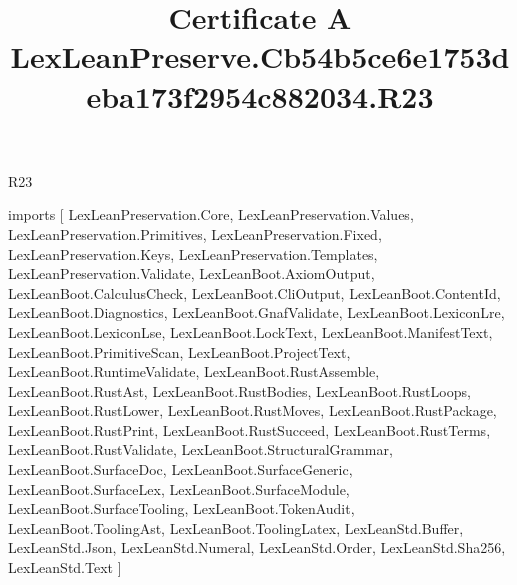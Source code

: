 \begin{lexlean}{R23}
\title{Certificate A LexLeanPreserve.Cb54b5ce6e1753deba173f2954c882034.R23}
\begin{coremodule}
imports [
  LexLeanPreservation.Core,
  LexLeanPreservation.Values,
  LexLeanPreservation.Primitives,
  LexLeanPreservation.Fixed,
  LexLeanPreservation.Keys,
  LexLeanPreservation.Templates,
  LexLeanPreservation.Validate,
  LexLeanBoot.AxiomOutput,
  LexLeanBoot.CalculusCheck,
  LexLeanBoot.CliOutput,
  LexLeanBoot.ContentId,
  LexLeanBoot.Diagnostics,
  LexLeanBoot.GnafValidate,
  LexLeanBoot.LexiconLre,
  LexLeanBoot.LexiconLse,
  LexLeanBoot.LockText,
  LexLeanBoot.ManifestText,
  LexLeanBoot.PrimitiveScan,
  LexLeanBoot.ProjectText,
  LexLeanBoot.RuntimeValidate,
  LexLeanBoot.RustAssemble,
  LexLeanBoot.RustAst,
  LexLeanBoot.RustBodies,
  LexLeanBoot.RustLoops,
  LexLeanBoot.RustLower,
  LexLeanBoot.RustMoves,
  LexLeanBoot.RustPackage,
  LexLeanBoot.RustPrint,
  LexLeanBoot.RustSucceed,
  LexLeanBoot.RustTerms,
  LexLeanBoot.RustValidate,
  LexLeanBoot.StructuralGrammar,
  LexLeanBoot.SurfaceDoc,
  LexLeanBoot.SurfaceGeneric,
  LexLeanBoot.SurfaceLex,
  LexLeanBoot.SurfaceModule,
  LexLeanBoot.SurfaceTooling,
  LexLeanBoot.TokenAudit,
  LexLeanBoot.ToolingAst,
  LexLeanBoot.ToolingLatex,
  LexLeanStd.Buffer,
  LexLeanStd.Json,
  LexLeanStd.Numeral,
  LexLeanStd.Order,
  LexLeanStd.Sha256,
  LexLeanStd.Text
]


\end{coremodule}
\end{lexlean}
